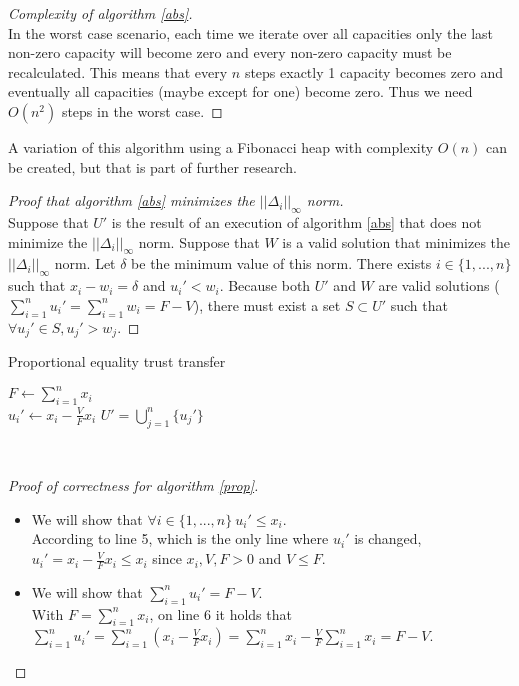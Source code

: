 \documentclass[11pt]{article}
\theoremstyle{definition}
\theoremstyle{corollary}
\begin{document}
    \begin{proof}[Complexity of algorithm \ref{abs}] \ \\
       In the worst case scenario, each time we iterate over all capacities only the last non-zero capacity will become zero
       and every non-zero capacity must be recalculated. This means that every $n$ steps exactly 1 capacity becomes zero
       and eventually all capacities (maybe except for one) become zero. Thus we need $O(n^2)$ steps in the worst case.
    \end{proof}
    A variation of this algorithm using a Fibonacci heap with complexity $O(n)$ can be created, but that is part of 
    further research.
    \begin{proof}[Proof that algorithm \ref{abs} minimizes the $||\Delta_i||_\infty$ norm] \ \\
       Suppose that $U'$ is the result of an execution of algorithm \ref{abs} that does not minimize the $||\Delta_i||_\infty$
       norm. Suppose that $W$ is a valid solution that minimizes the $||\Delta_i||_\infty$ norm. Let $\delta$ be the minimum
       value of this norm. There exists $i \in \{1,...,n\}$ such that $x_i - w_i = \delta$ and $u_i' < w_i$. Because both $U'$
       and $W$ are valid solutions ($\sum\limits_{i=1}^{n}u_i' = \sum\limits_{i=1}^{n}w_i = F - V$), there must exist a set
       $S \subset U'$ such that $\forall u_j' \in S, u_j' > w_j$.
    \end{proof}
    \begin{algorithm}[H]
       \label{prop}
       \caption{Proportional equality trust transfer}
       $F \gets \sum\limits_{i=1}^{n}x_i$ \\
          {$u_i' \gets x_i - \frac{V}{F} x_i$}
       \Return $U' = \bigcup\limits_{j=1}^{n}\{u_j'\}$
    \end{algorithm} \ \\
    \begin{proof}[Proof of correctness for algorithm \ref{prop}] \
       \begin{itemize}
          \item We will show that $\forall i \in \{1,...,n\} \: u_i' \leq x_i$. \\
          According to line 5, which is the only line where $u_i'$ is changed, $u_i' = x_i - \frac{V}{F}x_i \leq x_i$
          since $x_i, V, F > 0$ and $V \leq F$.
          \item We will show that $\sum\limits_{i=1}^{n}u_i' = F - V$. \\
          With $F = \sum\limits_{i=1}^{n}x_i$, on line 6 it holds that $\sum\limits_{i=1}^{n}u_i' = \sum\limits_{i=1}^{n}
          (x_i - \frac{V}{F}x_i) = \sum\limits_{i=1}^{n}x_i - \frac{V}{F}\sum\limits_{i=1}^{n}x_i = F - V$.
       \end{itemize}
    \end{proof}
\end{document}
